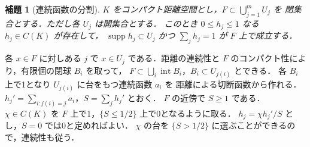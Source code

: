 \documentclass[a5paper,10pt,onecolumn]{jsarticle}
\makeatletter
\theoremstyle{mathnotetheorem}
\newtheorem{lemma}[theorem]{補題}
\renewcommand{\proofname}{証明}
\renewenvironment{proof}[1][\proofname]{%
  \par\pushQED{\qed}\normalfont\topsep4\p@\@plus2\p@\relax
  \trivlist\item[\hskip\labelsep\bfseries #1]\ignorespaces
}{\popQED\endtrivlist\@endpefalse}
\makeatother
\begin{document}
\begin{lemma}[連続函数の分割]
$K$ をコンパクト距離空間とし，$F\subset\bigcup_{j=1}^m U_j$ を
閉集合とする．ただし各 $U_j$ は開集合とする．
このとき $0\le h_j\le1$ なる $h_j\in C(K)$ が存在して，
$\operatorname{supp}h_j\subset U_j$ かつ
$\sum_jh_j=1$ が $F$ 上で成立する．
\end{lemma}
\begin{proof}
各 $x\in F$ に対しある $j$ で $x\in U_j$ である．距離の連続性と
$F$ のコンパクト性により，有限個の閉球 $B_i$ を取って，
$F\subset\bigcup_i\operatorname{int} B_i$，$B_i\subset U_{j(i)}$ とできる．
各 $B_i$ 上で1となり $U_{j(i)}$ に台をもつ連続函数 $a_i$ を
距離による切断函数から作れる．
$h_j'=\sum_{i:j(i)=j}a_i$，$S=\sum_jh_j'$ とおく．
$F$ の近傍で $S\ge1$ である．$\chi\in C(K)$ を
$F$ 上で1，$\{S\le1/2\}$ 上で0となるように取る．
$h_j=\chi h_j'/S$ とし，$S=0$ では0と定めればよい．
$\chi$ の台を $\{S>1/2\}$ に選ぶことができるので，連続性も従う．
\end{proof}
\end{document}
